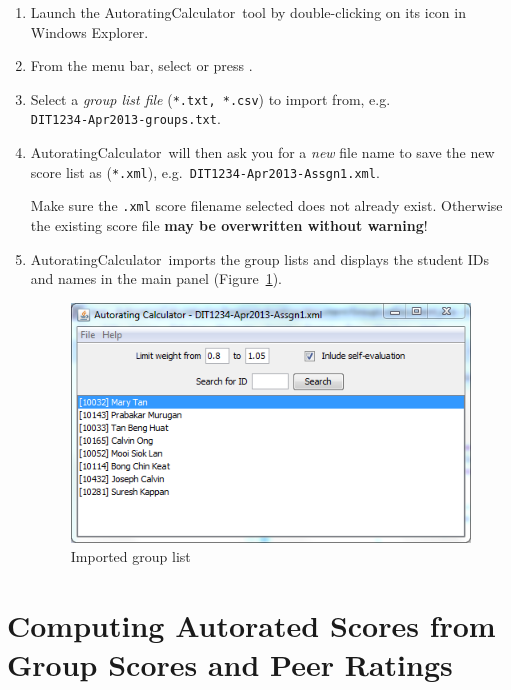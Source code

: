 \documentclass[a4paper,11pt]{refart}
\newcommand\AutoCalc{\textsf{AutoratingCalculator}}
\begin{document}
\begin{enumerate}
\item Launch the \AutoCalc\ tool by double-clicking on its icon in Windows Explorer.
\item From the menu bar, select  or press .
\item Select a \emph{group list file} (\texttt{*.txt, *.csv}) to import from, e.g.\\\texttt{DIT1234-Apr2013-groups.txt}.
\item \AutoCalc\ will then ask you for a \emph{new} file name to save the new score list as (\texttt{*.xml}), e.g.~\texttt{DIT1234-Apr2013-Assgn1.xml}.


\medskip

\begin{leftbar}
Make sure the \texttt{.xml} score filename selected does not already exist. Otherwise the existing score file \textbf{may be overwritten without warning}!
\end{leftbar}

\medskip

\item \AutoCalc\ imports the group lists and displays the student IDs and names in the main panel (Figure~\ref{fig:grouplist}).

\begin{figure}[hbt!]\centering
\includegraphics[width=\textwidth]{grouplist.png}
\caption{Imported group list}\label{fig:grouplist}
\end{figure}
\end{enumerate}

\section{Computing Autorated Scores from Group Scores and Peer Ratings}
\end{document}
